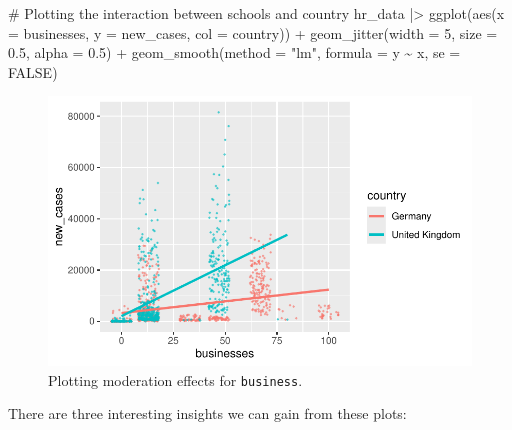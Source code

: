 \documentclass[
  letterpaper,
]{krantz}
\makeatletter
\newenvironment{Shaded}{\begin{snugshade}}{\end{snugshade}}
\newcommand{\AttributeTok}[1]{\textcolor[rgb]{0.40,0.45,0.13}{#1}}
\newcommand{\CommentTok}[1]{\textcolor[rgb]{0.37,0.37,0.37}{#1}}
\newcommand{\ConstantTok}[1]{\textcolor[rgb]{0.56,0.35,0.01}{#1}}
\newcommand{\DecValTok}[1]{\textcolor[rgb]{0.68,0.00,0.00}{#1}}
\newcommand{\FloatTok}[1]{\textcolor[rgb]{0.68,0.00,0.00}{#1}}
\newcommand{\FunctionTok}[1]{\textcolor[rgb]{0.28,0.35,0.67}{#1}}
\newcommand{\NormalTok}[1]{\textcolor[rgb]{0.00,0.23,0.31}{#1}}
\newcommand{\SpecialCharTok}[1]{\textcolor[rgb]{0.37,0.37,0.37}{#1}}
\newcommand{\StringTok}[1]{\textcolor[rgb]{0.13,0.47,0.30}{#1}}
\newenvironment{kframe}{%
\medskip{}
\setlength{\fboxsep}{.8em}
 \def\at@end@of@kframe{}%
 \ifinner\ifhmode%
  \def\at@end@of@kframe{\end{minipage}}%
  \begin{minipage}{\columnwidth}%
 \fi\fi%
 \def\FrameCommand##1{\hskip\@totalleftmargin \hskip-\fboxsep
 \colorbox{shadecolor}{##1}\hskip-\fboxsep
     \hskip-\linewidth \hskip-\@totalleftmargin \hskip\columnwidth}%
 \MakeFramed {\advance\hsize-\width
   \@totalleftmargin\z@ \linewidth\hsize
   \@setminipage}}%
 {\par\unskip\endMakeFramed%
 \at@end@of@kframe}
\renewenvironment{Shaded}{\begin{kframe}}{\end{kframe}}
\makeatother
\begin{document}
\begin{Shaded}
\begin{Highlighting}[]
\CommentTok{\# Plotting the interaction between schools and country}
\NormalTok{hr\_data }\SpecialCharTok{|\textgreater{}}
  \FunctionTok{ggplot}\NormalTok{(}\FunctionTok{aes}\NormalTok{(}\AttributeTok{x =}\NormalTok{ businesses,}
             \AttributeTok{y =}\NormalTok{ new\_cases,}
             \AttributeTok{col =}\NormalTok{ country)) }\SpecialCharTok{+}
  \FunctionTok{geom\_jitter}\NormalTok{(}\AttributeTok{width =} \DecValTok{5}\NormalTok{,}
              \AttributeTok{size =} \FloatTok{0.5}\NormalTok{,}
              \AttributeTok{alpha =} \FloatTok{0.5}\NormalTok{) }\SpecialCharTok{+}
  \FunctionTok{geom\_smooth}\NormalTok{(}\AttributeTok{method =} \StringTok{"lm"}\NormalTok{,}
              \AttributeTok{formula =}\NormalTok{ y }\SpecialCharTok{\textasciitilde{}}\NormalTok{ x,}
              \AttributeTok{se =} \ConstantTok{FALSE}\NormalTok{)}
\end{Highlighting}
\end{Shaded}

\begin{figure}[H]

{\centering \includegraphics{13_regressions_files/figure-latex/plotting-moderation-effects-businesses-1.pdf}

}

\caption{Plotting moderation effects for \texttt{business}.}

\end{figure}%

There are three interesting insights we can gain from these plots:
\end{document}
